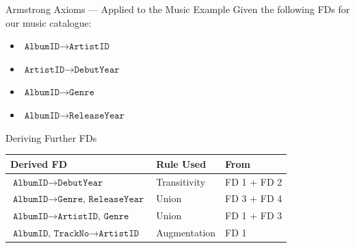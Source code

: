 \begin{frame}{Armstrong Axioms --- Applied to the Music Example}
  Given the following FDs for our music catalogue:
  \begin{itemize}
    \item $\texttt{AlbumID} \to \texttt{ArtistID}$
    \item $\texttt{ArtistID} \to \texttt{DebutYear}$
    \item $\texttt{AlbumID} \to \texttt{Genre}$
    \item $\texttt{AlbumID} \to \texttt{ReleaseYear}$
  \end{itemize}

  \vspace{6pt}
  \begin{examples}{Deriving Further FDs}
    \begin{tabular}{lll}
      \toprule
      \textbf{Derived FD} & \textbf{Rule Used} & \textbf{From} \\
      \midrule
      $\texttt{AlbumID} \to \texttt{DebutYear}$ & Transitivity & FD 1 + FD 2 \\
      $\texttt{AlbumID} \to \texttt{Genre, ReleaseYear}$ & Union & FD 3 + FD 4 \\
      $\texttt{AlbumID} \to \texttt{ArtistID, Genre}$ & Union & FD 1 + FD 3 \\
      $\texttt{AlbumID, TrackNo} \to \texttt{ArtistID}$ & Augmentation & FD 1 \\
      \bottomrule
    \end{tabular}
  \end{examples}
\end{frame}

